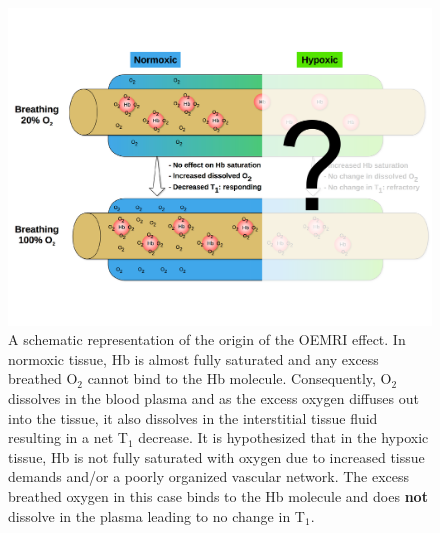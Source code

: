	\begin{figure}
		\begin{center}
		\includegraphics[width=\textwidth]{./oemri_thesis1/oemri_thesis1-images/oemriDark.pdf}
		\caption{A schematic representation of the origin of the OEMRI effect. In normoxic tissue, \acs{Hb} is almost fully saturated and any excess breathed O$_2$ cannot bind to the \acs{Hb} molecule. Consequently, O$_2$ dissolves in the blood plasma and as the excess oxygen diffuses out into the tissue, it also dissolves in the interstitial tissue fluid resulting in a net T$_1$ decrease. It is hypothesized that in the hypoxic tissue, \acs{Hb} is not fully saturated with oxygen due to increased tissue demands and/or a poorly organized vascular network. The excess breathed oxygen in this case binds to the \acs{Hb} molecule and does \textbf{not} dissolve in the plasma leading to no change in T$_1$.}
		\label{oemri}
		\end{center}
	\end{figure}





